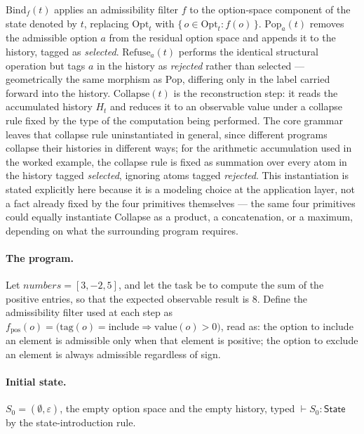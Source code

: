 \documentclass[11pt]{article}
\begin{document}
$\mathrm{Bind}_f(t)$ applies an admissibility filter $f$ to the option-space component of the state denoted by $t$, replacing $\mathrm{Opt}_t$ with $\{\, o \in \mathrm{Opt}_t : f(o) \,\}$. $\mathrm{Pop}_a(t)$ removes the admissible option $a$ from the residual option space and appends it to the history, tagged as \emph{selected}. $\mathrm{Refuse}_a(t)$ performs the identical structural operation but tags $a$ in the history as \emph{rejected} rather than selected --- geometrically the same morphism as Pop, differing only in the label carried forward into the history. $\mathrm{Collapse}(t)$ is the reconstruction step: it reads the accumulated history $H_t$ and reduces it to an observable value under a collapse rule fixed by the type of the computation being performed. The core grammar leaves that collapse rule uninstantiated in general, since different programs collapse their histories in different ways; for the arithmetic accumulation used in the worked example, the collapse rule is fixed as summation over every atom in the history tagged \emph{selected}, ignoring atoms tagged \emph{rejected}. This instantiation is stated explicitly here because it is a modeling choice at the application layer, not a fact already fixed by the four primitives themselves --- the same four primitives could equally instantiate Collapse as a product, a concatenation, or a maximum, depending on what the surrounding program requires.

\paragraph{The program.} Let $\mathit{numbers} = [3, -2, 5]$, and let the task be to compute the sum of the positive entries, so that the expected observable result is $8$. Define the admissibility filter used at each step as $f_{\mathrm{pos}}(o) = \big(\mathrm{tag}(o) = \mathrm{include} \Rightarrow \mathrm{value}(o) > 0\big)$, read as: the option to include an element is admissible only when that element is positive; the option to exclude an element is always admissible regardless of sign.

\paragraph{Initial state.} $S_0 = (\emptyset, \varepsilon)$, the empty option space and the empty history, typed $\vdash S_0 : \mathsf{State}$ by the state-introduction rule.
\end{document}
